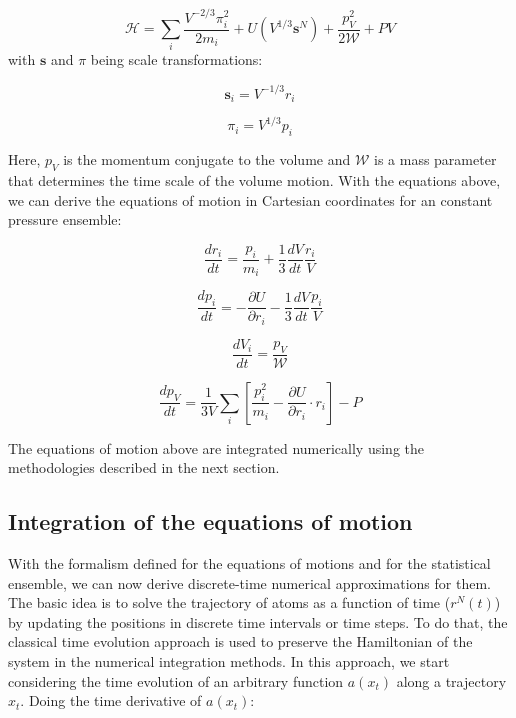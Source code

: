 \begin{equation}
\mathcal{H} =  \sum_{i} \frac{V^{-2/3} \pi _{i}^{2}}{2 m_{i}} + U(V^{1/3} \mathbf{s}^{N})  + \frac{p_{V} ^{2} }{2\mathcal{W}} + PV
\end{equation}
with $\mathbf{s}$ and $\pi$ being scale transformations:

\begin{equation}
\mathbf{s} _{i} =  V^{-1/3} r_{i} 
\end{equation}

\begin{equation}
\pi _{i} =  V^{1/3} p _{i}
\end{equation}

Here, $p_{V} $ is the momentum conjugate to the volume and $\mathcal{W}$ is a mass parameter that determines the time scale of the volume motion. With the equations above, we can derive the equations of motion in Cartesian coordinates for an constant pressure ensemble:

\begin{equation}
\frac{dr_{i}}{dt} = \frac{p_{i}}{m_{i}} + \frac{1}{3} \frac{dV}{dt} \frac{r_{i}}{V}
\end{equation}

\begin{equation}
\frac{dp_{i}}{dt} = -  \frac{\partial U}{\partial r_{i}} - \frac{1}{3} \frac{dV}{dt} \frac{p_{i}}{V}
\end{equation}

\begin{equation}
\frac{dV_{i}}{dt} = \frac{p_{V}}{\mathcal{W}}
\end{equation}

\begin{equation}
\frac{dp_{V}}{dt} = \frac{1}{3V} \sum_{i} \left [ \frac{p_{i}^{2}}{m_{i}} -  \frac{\partial U}{\partial r_{i}} \cdot r_{i} \right] -P
\end{equation}

The equations of motion above are integrated numerically using the methodologies described in the next section.

\subsection{Integration of the equations of motion}

With the formalism defined for the equations of motions and for the statistical ensemble, we can now derive discrete-time numerical approximations for them.  The basic idea is to solve the trajectory of atoms as a function of time ($r^{N}(t)$) by updating the positions in discrete time intervals or time steps. To do that, the classical time evolution approach is used to preserve the Hamiltonian of the system in the numerical integration methods. In this approach, we start considering the time evolution of an arbitrary function $a(x_{t})$ along a trajectory $x_{t}$. Doing the time derivative of $a(x_{t})$:

